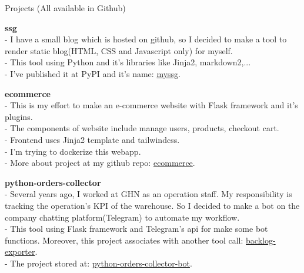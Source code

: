 \documentclass{resume} %
\begin{document}
\begin{rSection}{Projects (All available in Github)}

{\bf ssg}
\\- I have a small blog which is hosted on github, so I decided to make a tool to render static blog(HTML, CSS and Javascript only) for myself.
\\- This tool using Python and it's libraries like Jinja2, markdown2,...
\\- I've published it at PyPI and it's name: \href{https://pypi.org/project/myssg/}{myssg}.

{\bf ecommerce}
\\- This is my effort to make an e-commerce website with Flask framework and it's plugins.
\\- The components of website include manage users, products, checkout cart.
\\- Frontend uses Jinja2 template and tailwindcss.
\\- I'm trying to dockerize this webapp.
\\- More about project at my github repo: \href{https://github.com/tranvietphuoc/ecommerce}{ecommerce}.


{\bf python-orders-collector}
\\- Several years ago, I worked at GHN as an operation staff. My responsibility is tracking the operation's KPI of the warehouse. So I decided to make a bot on the company chatting platform(Telegram) to automate my workflow.
\\- This tool using Flask framework and Telegram's api for make some bot functions. Moreover, this project associates with another tool call:  \href{https://github.com/tranvietphuoc/backlog-exporter}{backlog-exporter}.
\\- The project stored at:  \href{https://github.com/tranvietphuoc/python-orders-collector-bot}{python-orders-collector-bot}.



\end{rSection}
\end{document}
